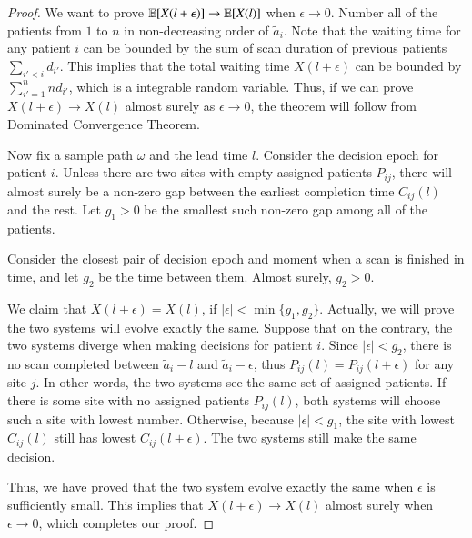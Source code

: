 \begin{proof}
We want to prove $\operatorname*{\mathbb{E}}[X(l+\epsilon)] \rightarrow \operatorname*{\mathbb{E}}[X(l)]$ when
$\epsilon \rightarrow 0$.
Number all of the patients from $1$ to $n$ in non-decreasing order of $\tilde a_i$.
Note that the waiting time for any patient $i$ can be bounded
by the sum of scan duration of previous patients $\sum_{i' < i} d_{i'}$.
This implies that the total waiting time $X(l+\epsilon)$
can be bounded by $\sum_{i'=1}^n nd_{i'}$, which is
a integrable random variable. Thus, if we can prove
$X(l+\epsilon) \rightarrow X(l)$ almost surely
as $\epsilon \rightarrow 0$, the theorem will follow from
Dominated Convergence Theorem.

Now fix a sample path $\omega$ and the lead time $l$.
Consider the decision epoch for patient $i$.
Unless there are two sites with empty assigned patients $P_{ij}$, there will almost surely
be a non-zero gap between the earliest completion time $C_{ij}(l)$ and the rest.
Let $g_1>0$ be the smallest such non-zero gap among all of the patients.

Consider the closest pair of decision epoch and moment when a scan
is finished in time, and let $g_2$ be the time between them.
Almost surely, $g_2 > 0$.

We claim that $X(l+\epsilon)=X(l)$, if $|\epsilon| < \min\{g_1, g_2\}$.
Actually, we will prove the two systems will evolve exactly the same.
Suppose that on the contrary, the two systems diverge when
making decisions for patient $i$. Since $|\epsilon| < g_2$,
there is no scan completed between $\tilde a_i -l$ and
$\tilde a_i-\epsilon$, thus $P_{ij}(l) = P_{ij}(l+\epsilon)$ for any site $j$.
In other words, the two systems see the same set of assigned patients.
If there is some site with no assigned patients $P_{ij}(l)$,
both systems will choose such a site with lowest number.
Otherwise, because $|\epsilon| < g_1$, the site with lowest $C_{ij}(l)$
still has lowest $C_{ij}(l+\epsilon)$. The two systems still
make the same decision.

Thus, we have proved that the two system evolve
exactly the same when $\epsilon$ is sufficiently small.
This implies that $X(l+\epsilon) \rightarrow X(l)$ almost surely
when $\epsilon \rightarrow 0$, which completes our proof.
\end{proof}
